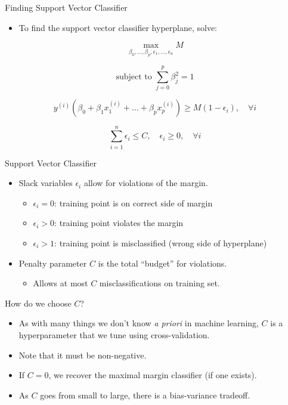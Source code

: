 \begin{frame}{Finding Support Vector Classifier}
    \begin{itemize}
        \item To find the support vector classifier hyperplane, solve:
    \end{itemize}

    \[
    \max_{\beta_0, \ldots, \beta_p, \epsilon_1, \ldots, \epsilon_n} M
    \]

    \[
    \text{subject to } \sum_{j=0}^{p} \beta_j^2 = 1
    \]

    \[
    y^{(i)} \left( \beta_0 + \beta_1 x_1^{(i)} + \ldots + \beta_p x_p^{(i)} \right) \geq M (1 - \epsilon_i), \quad \forall i
    \]

    \[
    \sum_{i=1}^{n} \epsilon_i \leq C, \quad \epsilon_i \geq 0, \quad \forall i
    \]
\end{frame}


\begin{frame}{Support Vector Classifier}
    \begin{itemize}
        \item Slack variables $\epsilon_i$ allow for violations of the margin.
        \begin{itemize}
            \item $\epsilon_i = 0$: training point is on correct side of margin
            \item $\epsilon_i > 0$: training point violates the margin
            \item $\epsilon_i > 1$: training point is misclassified (wrong side of hyperplane)
        \end{itemize}
        \item Penalty parameter $C$ is the total ``budget'' for violations.
        \begin{itemize}
            \item Allows at most $C$ misclassifications on training set.
        \end{itemize}
    \end{itemize}
\end{frame}


\begin{frame}{How do we choose $C$?}
    \begin{itemize}
        \item As with many things we don’t know \textit{a priori} in machine learning, $C$ is a hyperparameter that we tune using cross-validation.
        \item Note that it must be non-negative.
        \item If $C = 0$, we recover the maximal margin classifier (if one exists).
        \item As $C$ goes from small to large, there is a bias-variance tradeoff.
    \end{itemize}
\end{frame}

